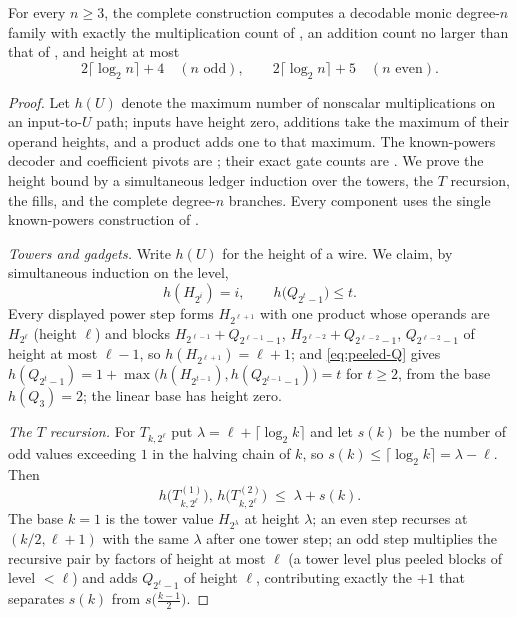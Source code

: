 \begin{theorem}
\label{thm:construction-height}
For every $n\ge3$, the complete construction computes a decodable monic
degree-$n$ family with exactly the multiplication count of
, an addition count no larger than that of
, and height at most
\[
  2\lceil\log_2n\rceil+4 \quad (n\text{ odd}),\qquad
  2\lceil\log_2n\rceil+5 \quad (n\text{ even}).
\]
\end{theorem}
\begin{proof}
Let $h(U)$ denote the maximum number of nonscalar multiplications on
an input-to-$U$ path; inputs have height zero, additions take the maximum
of their operand heights, and a product adds one to that maximum.
The known-powers decoder and coefficient pivots are
; their exact gate counts
are .  We prove the height bound by a simultaneous
ledger induction over the towers, the $T$ recursion, the fills, and the
complete degree-$n$ branches.  Every component uses the single
known-powers construction of .

\emph{Towers and gadgets.}  Write $h(U)$ for the height of a wire.  We
claim, by simultaneous induction on the level,
\[
  h(H_{2^i})=i,
  \qquad
  h\bigl(Q_{2^t-1}\bigr)\le t .
\]
Every displayed power step forms $H_{2^{\ell+1}}$ with one product whose
operands are $H_{2^\ell}$ (height $\ell$) and blocks
$H_{2^{\ell-1}}+Q_{2^{\ell-1}-1}$,
$H_{2^{\ell-2}}+Q_{2^{\ell-2}-1}$,
$Q_{2^{\ell-2}-1}$ of height at most $\ell-1$, so
$h(H_{2^{\ell+1}})=\ell+1$; and \eqref{eq:peeled-Q} gives
$h(Q_{2^t-1})
 =1+\max\bigl(h(H_{2^{t-1}}),h(Q_{2^{t-1}-1})\bigr)=t$
for $t\ge2$, from the base $h(Q_3)=2$; the linear base has height zero.

\emph{The $T$ recursion.}  For $T_{k,2^\ell}$ put
$\lambda=\ell+\lceil\log_2k\rceil$ and let $s(k)$ be the number of odd
values exceeding $1$ in the halving chain of $k$, so
$s(k)\le\lceil\log_2k\rceil=\lambda-\ell$.  Then
\[
  h\bigl(T^{(1)}_{k,2^\ell}\bigr),\,h\bigl(T^{(2)}_{k,2^\ell}\bigr)
  \;\le\;\lambda+s(k).
\]
The base $k=1$ is the tower value $H_{2^\lambda}$ at height $\lambda$; an
even step recurses at $(k/2,\ell+1)$ with the same $\lambda$ after one
tower step; an odd step multiplies the recursive pair by factors of height
at most $\ell$ (a tower level plus peeled blocks of level $<\ell$) and adds
$Q_{2^\ell-1}$ of height $\ell$, contributing exactly the
$+1$ that separates $s(k)$ from $s\bigl(\tfrac{k-1}2\bigr)$.


\end{proof}
